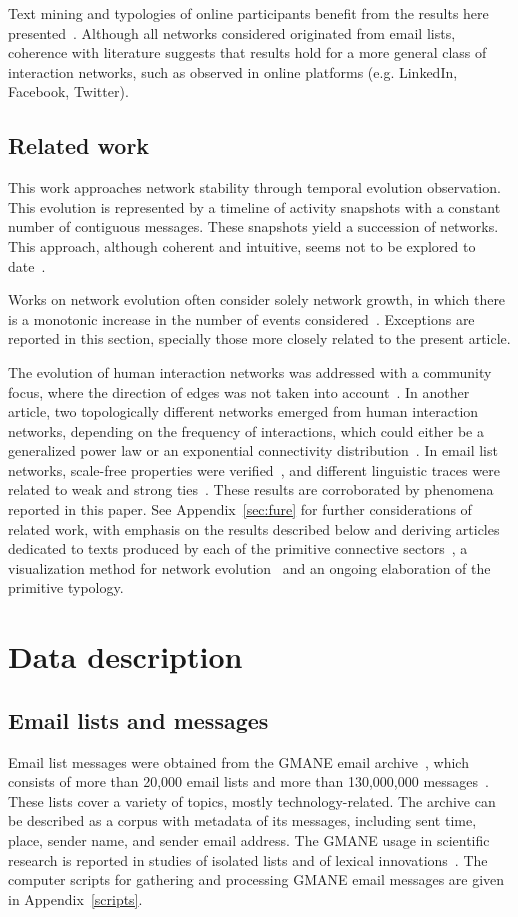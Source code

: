 \documentclass[%
 aip,
 jmp,%
 amsmath,amssymb,
 reprint,%
]{revtex4-1}
\begin{document}
Text mining and typologies of online participants benefit from the results here presented~\cite{rcText,rcTipo}. 
Although all networks considered originated from email lists,
 coherence with literature suggests that results hold for a more general class of interaction networks,
 such as observed in online platforms (e.g. LinkedIn, Facebook, Twitter).


\subsection{Related work}

This work approaches network stability through temporal evolution observation.
This evolution is represented by a timeline of activity snapshots with a constant number of contiguous messages. These snapshots yield a succession of networks. This approach, although coherent and intuitive, seems not to be explored to date~\cite{netWindowEvo}.

Works on network evolution often consider solely network growth, in which there is a monotonic increase in the number of events considered~\cite{barabasiEvo}. Exceptions are reported in this section, specially those more closely related to the present article.

The evolution of human interaction networks was addressed with a community focus, where the direction of edges was not taken into account~\cite{barabasiEvo}. In another article, two topologically different networks emerged from human interaction networks, depending on the frequency of interactions, which could either be a generalized power law or an exponential connectivity distribution~\cite{barabasiTopologicalEv}. In email list networks, scale-free properties were verified~\cite{bird}, and different linguistic traces were related to weak and strong ties~\cite{GMANE2}. These results are corroborated by phenomena reported in this paper. See Appendix~\ref{sec:fure} for further considerations of related work, with emphasis on the results described below and deriving articles dedicated to texts produced by each of the primitive connective sectors~\cite{rcText}, a visualization method for network evolution~\cite{versinus} and an ongoing elaboration of the primitive typology.

\section{Data description}
    \subsection{Email lists and messages}
Email list messages were obtained from
the GMANE email archive~\cite{GMANE}, which consists of more than 20,000 email lists and more than 130,000,000 messages~\cite{GMANEwikipedia}. These lists cover a variety of topics, mostly technology-related. The archive can be described as a corpus with metadata of its messages, including sent time, place, sender name, and sender email address.
The GMANE usage in scientific research is reported in studies of isolated lists and of lexical innovations~\cite{GMANE2,bird}. The computer scripts for gathering and processing GMANE email messages are given in Appendix~\ref{scripts}. 
\end{document}
